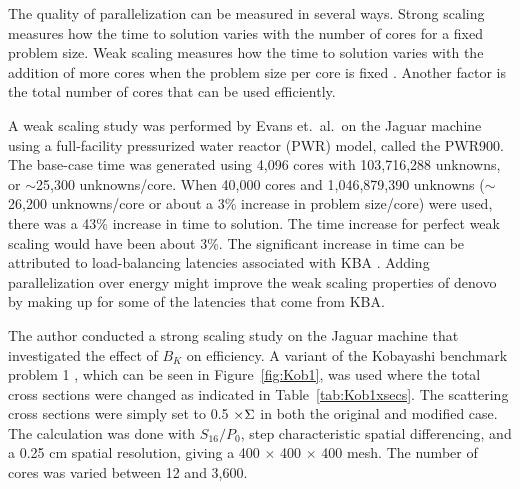 The quality of parallelization can be measured in several ways. Strong scaling measures how the time to solution varies with the number of cores for a fixed problem size. Weak scaling measures how the time to solution varies with the addition of more cores when the problem size per core is fixed \cite{Bush2010}. Another factor is the total number of cores that can be used efficiently. 

A weak scaling study was performed by Evans et.\ al.\ on the Jaguar machine using a full-facility pressurized water reactor (PWR) model, called the PWR900. The base-case time was generated using 4,096 cores with 103,716,288 unknowns, or $\sim$25,300 unknowns/core. When 40,000 cores and 1,046,879,390 unknowns ($\sim$26,200 unknowns/core or about a 3\% increase in problem size/core) were used, there was a 43\% increase in time to solution. The time increase for perfect weak scaling would have been about 3\%. The significant increase in time can be attributed to load-balancing latencies associated with KBA \cite{Evans2009d}. Adding parallelization over energy might improve the weak scaling properties of denovo by making up for some of the latencies that come from KBA.

The author conducted a strong scaling study on the Jaguar machine that investigated the effect of $B_{K}$ on efficiency. A variant of the Kobayashi benchmark problem 1 \cite{Kobayashi2000}, which can be seen in Figure~\ref{fig:Kob1}, was used where the total cross sections were changed as indicated in Table~\ref{tab:Kob1xsecs}. The scattering cross sections were simply set to 0.5 $\times \Sigma$ in both the original and modified case. The calculation was done with $S_{16}/P_{0}$, step characteristic spatial differencing, and a 0.25 cm spatial resolution, giving a 400 $\times$ 400 $\times$ 400 mesh.  The number of cores was varied between 12 and 3,600. 

